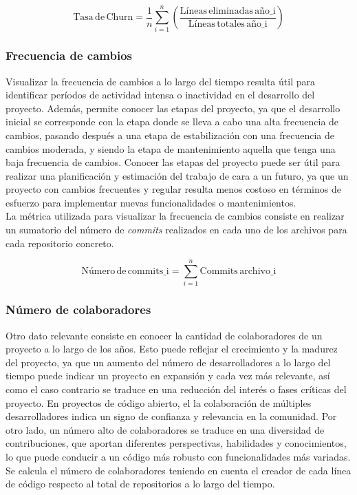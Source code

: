 \documentclass[a4paper, 12pt]{book}
\begin{document}
\[\text{Tasa} \, \text{de} \, \text{Churn} = \frac{1}{n} \sum_{i=1}^{n} \left( \frac{\text{Líneas} \, \text{eliminadas} \, \text{año_i}}{\text{Líneas} \, \text{totales} \, \text{año_i}} \right)\]

\subsubsection{Frecuencia de cambios}
\label{subsubsec:commits}

Visualizar la frecuencia de cambios a lo largo del tiempo resulta útil para identificar períodos de actividad intensa o inactividad en el desarrollo del proyecto. Además, permite conocer las etapas del proyecto, ya que el desarrollo
inicial se corresponde con la etapa donde se lleva a cabo una alta frecuencia de cambios, pasando después a una etapa de estabilización con una frecuencia de cambios moderada, y siendo la etapa de mantenimiento aquella que tenga una
baja frecuencia de cambios. Conocer las etapas del proyecto puede ser útil para realizar una planificación y estimación del trabajo de cara a un futuro, ya que un proyecto con cambios frecuentes y regular resulta menos costoso en
términos de esfuerzo para implementar nuevas funcionalidades o mantenimientos.
\\La métrica utilizada para visualizar la frecuencia de cambios consiste en realizar un sumatorio del número de \textit{commits} realizados en cada uno de los archivos para cada repositorio concreto.
 
\[\text{Número} \, \text{de} \, \text{commits_i} = \sum_{i=1}^{n} \text{Commits} \, \text{archivo_i}\]

\subsubsection{Número de colaboradores}
\label{subsubsec:numero-desarrolladores}

Otro dato relevante consiste en conocer la cantidad de colaboradores de un proyecto a lo largo de los años. Esto puede reflejar el crecimiento y la madurez del proyecto, ya que un aumento del número de desarrolladores
a lo largo del tiempo puede indicar un proyecto en expansión y cada vez más relevante, así como el caso contrario se traduce en una reducción del interés o fases críticas del proyecto. En proyectos de código 
abierto, el la colaboración de múltiples desarrolladores indica un signo de confianza y relevancia en la comunidad. Por otro lado, un número alto de colaboradores se traduce en una diversidad de contribuciones, que aportan
diferentes perspectivas, habilidades y conocimientos, lo que puede conducir a un código más robusto con funcionalidades más variadas.
\\Se calcula el número de colaboradores teniendo en cuenta el creador de cada línea de código respecto al total de repositorios a lo largo del tiempo.
\end{document}
